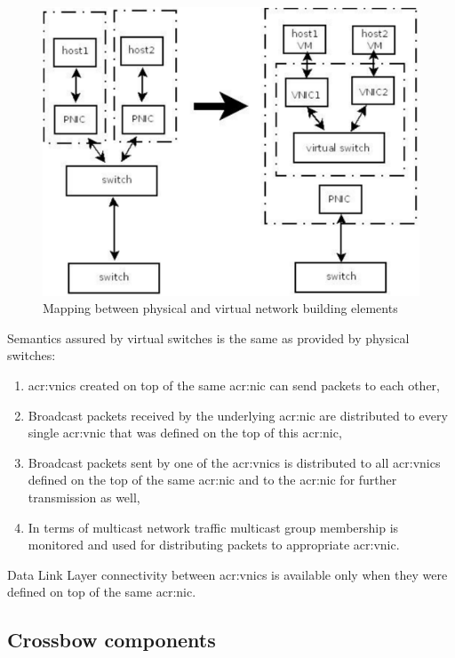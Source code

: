 \documentclass[11pt]{book}
\begin{document}
        \begin{figure}[H]
          \begin{center}
            \includegraphics[width=.7\textwidth]{img/physical_and_virtual_switches_mapping.pdf}
          \end{center}

          \caption{Mapping between physical and virtual network building elements}
        \end{figure}
        
        Semantics assured by virtual switches is the same as provided by physical switches: 

        \begin{enumerate}
          \item \gls{acr:vnic}s created on top of the same \gls{acr:nic} can send packets to each other,
          \item Broadcast packets received by the underlying \gls{acr:nic} are distributed to every single
                \gls{acr:vnic} that was defined on the top of this \gls{acr:nic},
          \item Broadcast packets sent by one of the \gls{acr:vnic}s is distributed to all \gls{acr:vnic}s defined on
                the top of the same \gls{acr:nic} and to the \gls{acr:nic} for further transmission as well,
          \item In terms of multicast network traffic multicast group membership is monitored and used for distributing
                packets to appropriate \gls{acr:vnic}.
        \end{enumerate}

        Data Link Layer connectivity between \gls{acr:vnic}s is available only when they were defined on top of the same
        \gls{acr:nic}. 

	
      \subsection{Crossbow components}
\end{document}
